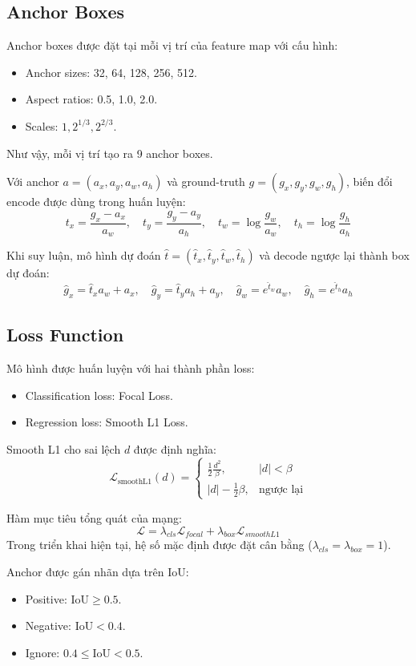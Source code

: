 \documentclass[12pt,a4paper]{article}
\begin{document}
\subsection{Anchor Boxes}

Anchor boxes được đặt tại mỗi vị trí của feature map với cấu hình:
\begin{itemize}
    \item Anchor sizes: 32, 64, 128, 256, 512.
    \item Aspect ratios: 0.5, 1.0, 2.0.
    \item Scales: $1, 2^{1/3}, 2^{2/3}$.
\end{itemize}

Như vậy, mỗi vị trí tạo ra 9 anchor boxes.

Với anchor $a=(a_x,a_y,a_w,a_h)$ và ground-truth $g=(g_x,g_y,g_w,g_h)$, biến đổi encode được dùng trong huấn luyện:
\[
t_x=\frac{g_x-a_x}{a_w},\quad
t_y=\frac{g_y-a_y}{a_h},\quad
t_w=\log\frac{g_w}{a_w},\quad
t_h=\log\frac{g_h}{a_h}
\]

Khi suy luận, mô hình dự đoán $\hat t=(\hat t_x,\hat t_y,\hat t_w,\hat t_h)$ và decode ngược lại thành box dự đoán:
\[
\hat g_x=\hat t_x a_w+a_x,\quad
\hat g_y=\hat t_y a_h+a_y,\quad
\hat g_w=e^{\hat t_w}a_w,\quad
\hat g_h=e^{\hat t_h}a_h
\]

\subsection{Loss Function}

Mô hình được huấn luyện với hai thành phần loss:
\begin{itemize}
    \item Classification loss: Focal Loss.
    \item Regression loss: Smooth L1 Loss.
\end{itemize}

Smooth L1 cho sai lệch $d$ được định nghĩa:
\[
\mathcal{L}_{\text{smoothL1}}(d)=
\begin{cases}
\frac{1}{2}\frac{d^2}{\beta}, & |d|<\beta\\
|d|-\frac{1}{2}\beta, & \text{ngược lại}
\end{cases}
\]

Hàm mục tiêu tổng quát của mạng:
\[
\mathcal{L}=\lambda_{cls}\mathcal{L}_{focal}+\lambda_{box}\mathcal{L}_{smoothL1}
\]
Trong triển khai hiện tại, hệ số mặc định được đặt cân bằng ($\lambda_{cls}=\lambda_{box}=1$).

Anchor được gán nhãn dựa trên IoU:
\begin{itemize}
    \item Positive: $\text{IoU} \ge 0.5$.
    \item Negative: $\text{IoU} < 0.4$.
    \item Ignore: $0.4 \le \text{IoU} < 0.5$.
\end{itemize}
\end{document}

